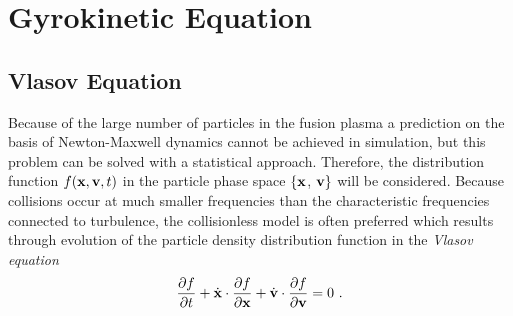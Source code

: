 \newpage
\section{Gyrokinetic Equation}
\label{sec:gyrokinetic}

\subsection{Vlasov Equation}
\label{sub:vlasov}

Because of the large number of particles in the fusion plasma a prediction on the basis of Newton-Maxwell dynamics cannot be achieved in simulation, but this problem can be solved with a statistical approach. Therefore, the distribution function $f(\boldsymbol{\mathbf{x}}, \boldsymbol{\mathbf{v}}, t)$ in the particle phase space $\{\boldsymbol{\mathbf{x}}$, $\boldsymbol{\mathbf{v}}\}$ will be considered. Because collisions occur at much smaller frequencies than the characteristic frequencies connected to turbulence, the collisionless model is often preferred \cite{Garbet2010} which results through evolution of the particle density distribution function in the \textit{Vlasov equation}
\begin{gather}
	\frac{\partial f}{\partial t} + \dot{\boldsymbol{\mathbf{x}}} \cdot \frac{\partial f}{\partial \boldsymbol{\mathbf{x}}}  + \dot{\boldsymbol{\mathbf{v}}} \cdot \frac{\partial f}{\partial \boldsymbol{\mathbf{v}}} = 0~.
	\label{eq:vlasov}
\end{gather}

